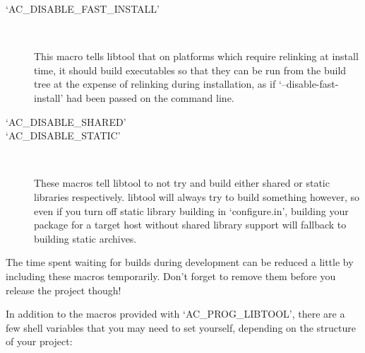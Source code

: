 \begin{description}
\item[`AC\_{}DISABLE\_{}FAST\_{}INSTALL']
\ 

%
This macro tells libtool that on platforms which require relinking at install time, it should build executables so that they can be run from the build tree at the expense of relinking during installation, as if `--disable-fast-install' had been passed on the command line. 


\item[`AC\_{}DISABLE\_{}SHARED']
\item[`AC\_{}DISABLE\_{}STATIC']
\ 

%
These macros tell libtool to not try and build either shared or static libraries respectively. libtool will always try to build something however, so even if you turn off static library building in `configure.in', building your package for a target host without shared library support will fallback to building static archives.
\end{description}

The time spent waiting for builds during development can be reduced a little by including these macros temporarily. Don't forget to remove them before you release the project though! 


In addition to the macros provided with `AC\_{}PROG\_{}LIBTOOL', there are a 
few shell variables that you may need to set yourself, depending on the 
structure of your project: 

